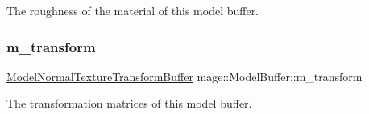 The roughness of the material of this model buffer. \hypertarget{structmage_1_1_model_buffer_adb77c7da1573f0d94665b73ea1887420}{}\label{structmage_1_1_model_buffer_adb77c7da1573f0d94665b73ea1887420} 
\subsubsection{\texorpdfstring{m\+\_\+transform}{m\_transform}}
{\footnotesize\ttfamily \hyperlink{structmage_1_1_model_normal_texture_transform_buffer}{Model\+Normal\+Texture\+Transform\+Buffer} mage\+::\+Model\+Buffer\+::m\+\_\+transform}

The transformation matrices of this model buffer. 